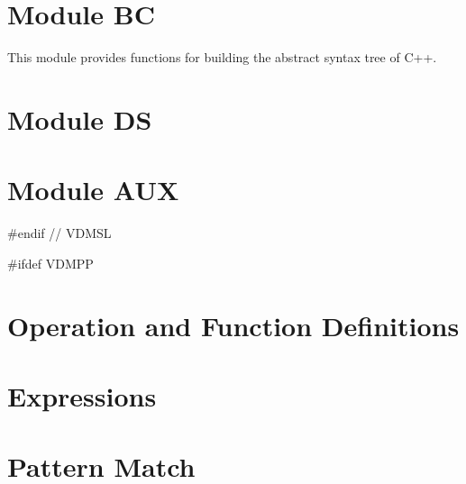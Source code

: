 \documentclass[a4paper,dvips]{article}
\begin{document}
\appendix





%


\section{Module BC}

This module provides functions for building the abstract syntax tree
of C++.




\section{Module DS}
\label{DS}



\section{Module AUX}
\label{AUX}

#endif // VDMSL

#ifdef VDMPP






\section{Operation and Function Definitions}\label{fctdef}



\section{Expressions}\label{expr}



\section{Pattern Match}\label{PM}

\end{document}
